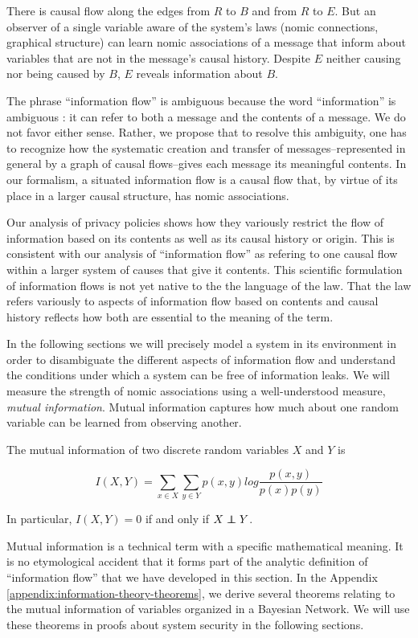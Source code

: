 \documentclass[../thesis.tex]{subfiles}
\begin{document}
There is causal flow along the edges from
$R$ to $B$ and from $R$ to $E$.
But an observer of a single variable aware of the
system's laws (nomic connections,
graphical structure) can learn nomic associations
of a message that inform about variables that
are not in the message's causal history.
Despite $E$ neither causing nor being caused by $B$,
$E$ reveals information about $B$.

The phrase ``information flow'' is ambiguous because the
word ``information'' is ambiguous \cite{nunberg1996farewell}:
it can refer to both a message and the contents of a message.
We do not favor either sense.
Rather, we propose that to resolve this ambiguity,
one has to recognize how the systematic creation and
transfer of messages--represented in general by a graph
of causal flows--gives each message its meaningful
contents.
In our formalism, a situated information flow is a causal flow
that, by virtue of its place in a larger causal structure,
has nomic associations.

Our analysis of privacy policies shows how
they variously restrict the flow
of information based on its contents as well as its
causal history or origin.
This is consistent with our analysis of ``information flow''
as refering to one causal flow within a larger system
of causes that give it contents.
This scientific formulation of information flows is not
yet native to the the language of the law.
That the law refers variously to aspects of information flow
based on contents and causal history reflects how
both are essential to the meaning of the term.

In the following sections we will precisely model a system
in its environment
in order to disambiguate the different
aspects of information flow and understand the conditions
under which a system can be free of information leaks.
We will measure the strength of
nomic associations using a well-understood measure,
\emph{mutual information}.
Mutual information 
captures how much about one random variable can be
learned from observing another.

\begin{dfn}
  The mutual information of two discrete random variables
  $X$ and $Y$ is

  $$I(X,Y) = \sum_{x \in X} \sum_{y \in Y} p(x,y) log \frac{p(x,y)}{p(x)p(y)}$$
\end{dfn}

In particular, $I(X,Y) = 0$ if and only if $X \independent Y$.

Mutual information is a technical term with a specific mathematical
meaning.
It is no etymological accident that it forms part of the analytic
definition of ``information flow'' that we have developed in this
section.
In the Appendix \ref{appendix:information-theory-theorems},
we derive several theorems relating to
the mutual information of variables organized in a Bayesian
Network.
We will use these theorems in proofs about system security
in the following sections.
\end{document}
